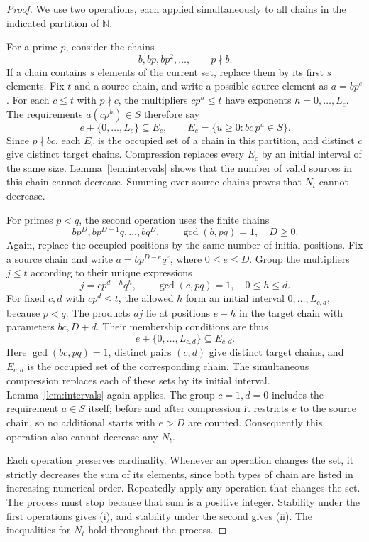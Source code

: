 \documentclass[11pt,a4paper]{article}
\newcommand{\N}{\mathbb N}
\begin{document}
\begin{proof}
We use two operations, each applied simultaneously to all chains in the indicated partition of $\N$.

For a prime $p$, consider the chains
\[
b,bp,bp^2,\ldots,\qquad p\nmid b.
\]
If a chain contains $s$ elements of the current set, replace them by its first $s$ elements.
Fix $t$ and a source chain, and write a possible source element as $a=bp^e$.
For each $c\le t$ with $p\nmid c$, the multipliers $cp^h\le t$ have exponents $h=0,\ldots,L_c$.
The requirements $a(cp^h)\in S$ therefore say
\[
e+\{0,\ldots,L_c\}\subseteq E_c,
\qquad
E_c=\{u\ge0:bc\,p^u\in S\}.
\]
Since $p\nmid bc$, each $E_c$ is the occupied set of a chain in this partition, and distinct $c$ give distinct target chains.
Compression replaces every $E_c$ by an initial interval of the same size.
Lemma~\ref{lem:intervals} shows that the number of valid sources in this chain cannot decrease.
Summing over source chains proves that $N_t$ cannot decrease.

For primes $p<q$, the second operation uses the finite chains
\begin{equation}\label{eq:pq-chain}
bp^D,bp^{D-1}q,\ldots,bq^D,
\qquad \gcd(b,pq)=1,\quad D\ge0.
\end{equation}
Again, replace the occupied positions by the same number of initial positions.
Fix a source chain and write $a=bp^{D-e}q^e$, where $0\le e\le D$.
Group the multipliers $j\le t$ according to their unique expressions
\[
j=cp^{d-h}q^h,
\qquad \gcd(c,pq)=1,\quad 0\le h\le d.
\]
For fixed $c,d$ with $cp^d\le t$, the allowed $h$ form an initial interval $0,\ldots,L_{c,d}$, because $p<q$.
The products $aj$ lie at positions $e+h$ in the target chain with parameters $bc,D+d$.
Their membership conditions are thus
\[
e+\{0,\ldots,L_{c,d}\}\subseteq E_{c,d}.
\]
Here $\gcd(bc,pq)=1$, distinct pairs $(c,d)$ give distinct target chains, and $E_{c,d}$ is the occupied set of the corresponding chain.
The simultaneous compression replaces each of these sets by its initial interval.
Lemma~\ref{lem:intervals} again applies.
The group $c=1,d=0$ includes the requirement $a\in S$ itself; before and after compression it restricts $e$ to the source chain, so no additional starts with $e>D$ are counted.
Consequently this operation also cannot decrease any $N_t$.

Each operation preserves cardinality.
Whenever an operation changes the set, it strictly decreases the sum of its elements, since both types of chain are listed in increasing numerical order.
Repeatedly apply any operation that changes the set.
The process must stop because that sum is a positive integer.
Stability under the first operations gives (i), and stability under the second gives (ii).
The inequalities for $N_t$ hold throughout the process.
\end{proof}
\end{document}
